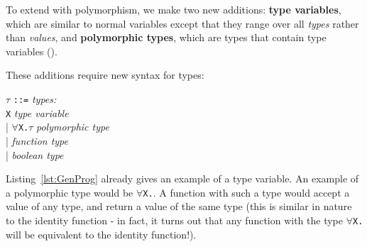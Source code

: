 To extend \lambdacalc{} with polymorphism, we make two new additions: \textbf{type variables}, which are similar to normal variables except that they range over all \textit{types} rather than \textit{values}, and \textbf{polymorphic types}, which are types that contain type variables (\cite{sorensen}).

\pagebreak
These additions require new syntax for types:
\begin{center}
$\tau$ \texttt{::=} 						\hfill \textit{types:} \\
\hspace{2em} \texttt{X}						\hfill \textit{type variable} \\
\hspace{2em} | \texttt{$\forall$X.$\tau$}	\hfill \textit{polymorphic type} \\
\hspace{2em} | 		\hfill \textit{function type} \\
\hspace{2em} | \Boolt{}						\hfill \textit{boolean type}
\end{center}
Listing~\ref{lst:GenProg} already gives an example of a type variable. An example of a polymorphic type would be \texttt{$\forall$X.}. A function with such a type would accept a value of any type, and return a value of the same type (this is similar in nature to the identity function - in fact, it turns out that any function with the type \texttt{$\forall$X.} will be equivalent to the identity function!).

